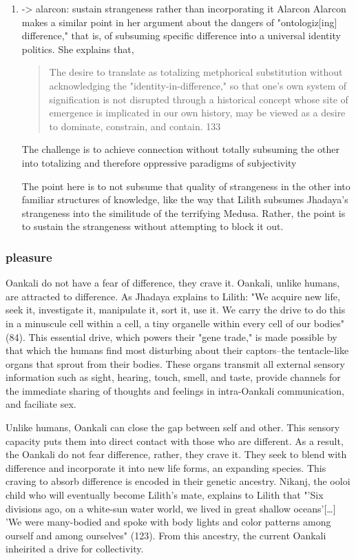 \documentclass[11pt]{article}
\begin{document}
\begin{enumerate}
\item -> alarcon: sustain strangeness rather than incorporating it
\label{sec:org2ae976d}
Alarcon Alarcon makes a similar point in her argument about the
dangers of "ontologiz[ing] difference," that is, of subsuming specific
difference into a universal identity politics. She explains that,
\begin{quote}
The desire to translate as totalizing metphorical substitution without
acknowledging the "identity-in-difference," so that one's own system
of signification is not disrupted through a historical concept whose
site of emergence is implicated in our own history, may be viewed as
a desire to dominate, constrain, and contain. 133 
\end{quote}
The challenge is to achieve connection without totally subsuming the
other into totalizing and therefore oppressive paradigms of
subjectivity 

The point here is to not subsume that quality of strangeness in the
  other into familiar structures of knowledge, like the way that
  Lilith subsumes Jhadaya's strangeness into the similitude of the
  terrifying Medusa. Rather, the point is to sustain the strangeness
  without attempting to block it out.
\end{enumerate}

\subsubsection{pleasure}
\label{sec:org2fefb3e}
Oankali do not have a fear of difference, they crave it.  Oankali,
unlike humans, are attracted to difference. As Jhadaya explains to
Lilith: "We acquire new life, seek it, investigate it, manipulate it,
sort it, use it. We carry the drive to do this in a minuscule cell
within a cell, a tiny organelle within every cell of our bodies"
(84). This essential drive, which powers their "gene trade," is made
possible by that which the humans find most disturbing about their
captors--the tentacle-like organs that sprout from their bodies. These
organs transmit all external sensory information such as sight,
hearing, touch, smell, and taste, provide channels for the immediate
sharing of thoughts and feelings in intra-Oankali communication, and
faciliate sex.

Unlike humans, Oankali can close the gap between self and other. This
sensory capacity puts them into direct contact with those who are
different. As a result, the Oankali do not fear difference, rather,
they crave it. They seek to blend with difference and incorporate it
into new life forms, an expanding species. This craving to absorb
difference is encoded in their genetic ancestry. Nikanj, the ooloi
child who will eventually become Lilith's mate, explains to Lilith
that "'Six divisions ago, on a white-sun water world, we lived in
great shallow oceans'[\ldots{}] 'We were many-bodied and spoke with body
lights and color patterns among ourself and among ourselves"
(123). From this ancestry, the current Oankali inheirited a drive for
collectivity.
\end{document}
